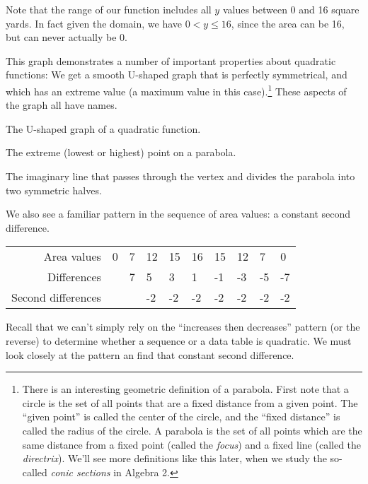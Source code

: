 Note that the range of our function includes all $y$ values between 0 and 16 square yards. In fact given the domain, we have $0 < y \leq 16$, since the area can be 16, but can never actually be 0.

This graph demonstrates a number of important properties about quadratic functions: We get a smooth U-shaped graph that is perfectly symmetrical, and which has an extreme value (a maximum value in this case).\footnote{There is an interesting geometric definition of a parabola. First note that a circle is the set of all points that are a fixed distance from a given point. The ``given point'' is called the center of the circle, and the ``fixed distance'' is called the radius of the circle. A parabola is the set of all points which are the same distance from a fixed point (called the \textit{focus}) and a fixed line (called the \textit{directrix}). We'll see more definitions like this later, when we study the so-called \textit{conic sections} in Algebra 2.} These aspects of the graph all have names.

\begin{boxeddef}[Parabola]
The U-shaped graph of a quadratic function.
\end{boxeddef}

\begin{boxeddef}[Vertex]
The extreme (lowest or highest) point on a parabola.
\end{boxeddef}

\begin{boxeddef}
The imaginary line that passes through the vertex and divides the parabola into two symmetric halves.
\end{boxeddef}

We also see a familiar pattern in the sequence of area values: a constant second difference.

\begin{table}
\begin{tabular}{r|*{9}{C{0.75cm}}}
Area values			& 0 & 7 & 12 & 15 & 16 & 15 & 12 & 7 & 0\\
Differences			& ~ & 7 & 5 & 3 & 1 & -1 & -3 & -5 & -7\\
Second differences	& ~ & ~ & -2 & -2 & -2 & -2 & -2 & -2 & -2\\
\end{tabular}
\end{table}

Recall that we can't simply rely on the ``increases then decreases'' pattern (or the reverse) to determine whether a sequence or a data table is quadratic. We must look closely at the pattern an find that constant second difference.

